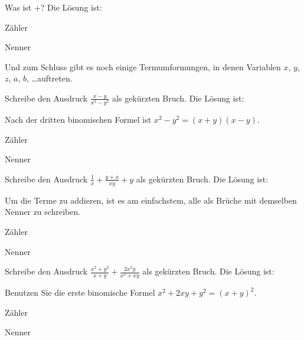 \documentclass{ximera}
\begin{document}
\begin{shuffle}
\begin{question}
Was ist +\cdot{}?
Die Lösung ist:
\begin{solution}
Zähler 
\end{solution}
\begin{solution}
Nenner 
\end{solution}
\end{question}

    
\end{shuffle}



Und zum Schluss gibt es noch einige Termumformungen, in denen Variablen $x$, $y$, $z$, $a$, $b$, \dots auftreten. 

\begin{shuffle}
    
\begin{question}
Schreibe den Ausdruck $\frac{x-y}{x^2-y^2}$ als gekürzten Bruch.
Die Lösung ist:
\begin{solution}
\begin{hint}
Nach der dritten binomischen Formel ist $x^2-y^2 = (x+y)(x-y)$.
\end{hint}
Zähler 
\end{solution}
\begin{solution}
Nenner 
\end{solution}
\end{question}

\begin{question}
Schreibe den Ausdruck $\frac{1}{x} + \frac{y+x}{xy} + y$ als gekürzten Bruch.
Die Lösung ist:
\begin{solution}
\begin{hint}
Um die Terme zu addieren, ist es am einfachstem, alle als Brüche mit demselben Nenner zu schreiben.
\end{hint}
Zähler 
\end{solution}
\begin{solution}
Nenner 
\end{solution}
\end{question}

\begin{question}
Schreibe den Ausdruck $\frac{x^2+y^2}{x+y} + \frac{2x^2y}{x^2+xy}$ als gekürzten Bruch.
Die Lösung ist:
\begin{solution}
\begin{hint}
Benutzen Sie die erste binomische Formel $x^2+2xy+y^2 = (x+y)^2$.
\end{hint}
Zähler 
\end{solution}
\begin{solution}
Nenner 
\end{solution}
\end{question}


\end{shuffle}
\end{document}
